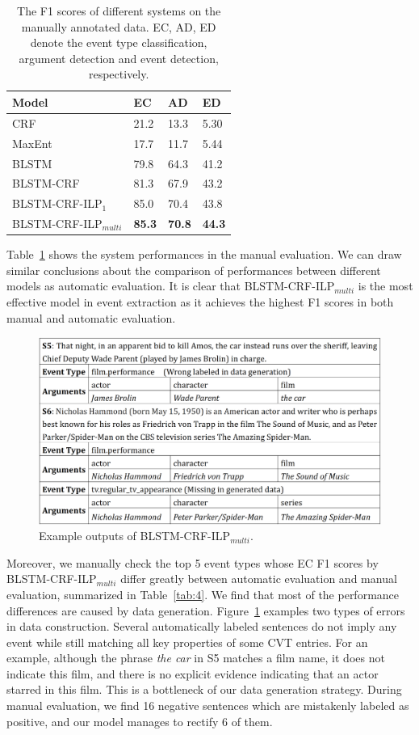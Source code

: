 \begin{table}[h]
\small
\centering
\begin{tabular}{|l|p{0.8cm}<{\centering}|p{0.8cm}<{\centering}|p{0.8cm}<{\centering}|} \hline
	Model & EC & AD & ED \\ \hline
	CRF & 21.2 & 13.3 & 5.30 \\ \hline
	MaxEnt & 17.7 & 11.7 & 5.44 \\ \hline
	BLSTM & 79.8 & 64.3 & 41.2 \\ \hline \hline
	BLSTM-CRF & 81.3 & 67.9 & 43.2 \\ \hline
	BLSTM-CRF-ILP$_{1}$ & 85.0 & 70.4 & 43.8 \\ \hline
	BLSTM-CRF-ILP$_{multi}$ & \textbf{85.3} & \textbf{70.8} & \textbf{44.3} \\ \hline
\end{tabular}
\caption{ The F1 scores of different systems on the manually annotated data. EC, AD, ED denote the event type classification, argument detection and event detection, respectively. \label{tab:2}}
\end{table}

Table~\ref{tab:2} shows the system performances in the manual evaluation. We can draw similar conclusions about the comparison of performances between different models as automatic evaluation. It is clear that BLSTM-CRF-ILP$_{multi}$ is the most effective model in event extraction as it achieves the highest F1 scores in both manual and automatic evaluation.

\begin{figure}[h]
	\centering
	\includegraphics[width=.48\textwidth]{temp_figure3.png}
	\caption{Example outputs of BLSTM-CRF-ILP$_{multi}$.\label{fig:1}}
\end{figure}

Moreover, %
 we manually check the top 5 event types whose EC F1 scores by BLSTM-CRF-ILP$_{multi}$ differ greatly between automatic evaluation and manual evaluation, summarized in Table~\ref{tab:4}. We find that most of the performance differences are caused by data generation. Figure~\ref{fig:1} examples two types of errors in data construction. Several automatically labeled sentences do not imply any event while still matching all key properties of some CVT entries. For an example, although the phrase \emph{the car} in S5 matches a film name, it does not indicate this film, and there is no explicit evidence indicating that an actor starred in this film. This is a bottleneck of our data generation strategy. During manual evaluation, we find 16 negative sentences which are mistakenly labeled as positive, and our model manages to rectify 6 of them.

